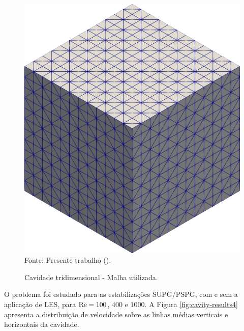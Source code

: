 \begin{figure}[h!]
    \centering
    \caption{Cavidade tridimensional - Malha utilizada.}
    \includegraphics[width=0.4\linewidth]{Figuras/cavity3D/malha.png}
    \\Fonte: Presente trabalho (\the\year).
    \label{fig:cavity-mesh3}
\end{figure}

O problema foi estudado para as estabilizações SUPG/PSPG, com e sem a aplicação de LES, para $\mathrm{Re}=100$, $400$ e $1000$. A Figura \ref{fig:cavity-results4} apresenta a distribuição de velocidade sobre as linhas médias verticais e horizontais da cavidade.

